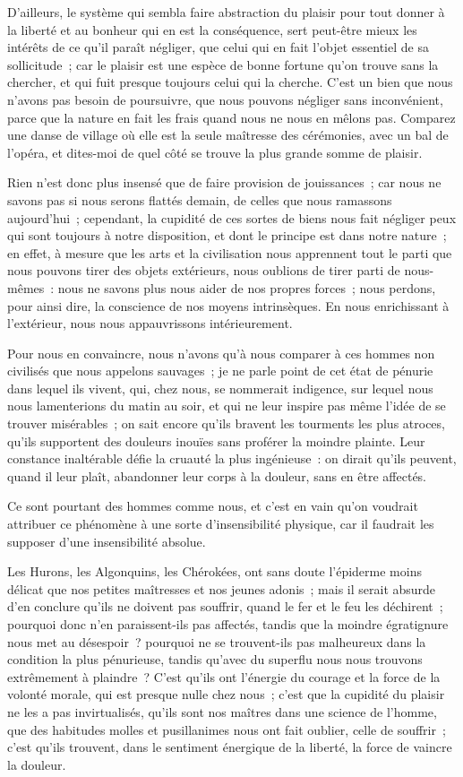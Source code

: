 \documentclass[french,twoside]{book} %
\begin{document}
D’ailleurs, le système qui sembla faire abstraction du plaisir pour tout donner à la liberté et au bonheur qui en est la conséquence, sert peut-être mieux les intérêts de ce qu’il paraît négliger, que celui qui en fait l’objet essentiel de sa sollicitude ; car le plaisir est une espèce de bonne fortune qu’on trouve sans la chercher, et qui fuit presque toujours celui qui la cherche. C’est un bien que nous n’avons pas besoin de poursuivre, que nous pouvons négliger sans inconvénient, parce que la nature en fait les frais quand nous ne nous en mêlons pas. Comparez une danse de village où elle est la seule maîtresse des cérémonies, avec un bal de l’opéra, et dites-moi de quel côté se trouve la plus grande somme de plaisir.\par
Rien n’est donc plus insensé que de faire provision de jouissances ; car nous ne savons pas si nous serons flattés demain, de celles que nous ramassons aujourd’hui ; cependant, la cupidité de ces sortes de biens nous fait négliger peux qui sont toujours à notre disposition, et dont le principe est dans notre nature ; en effet, à mesure que les arts et la civilisation nous apprennent tout le parti que nous pouvons tirer des objets extérieurs, nous oublions de tirer parti de nous-mêmes : nous ne savons plus nous aider de nos propres forces ; nous perdons, pour ainsi dire, la conscience de nos moyens intrinsèques. En nous enrichissant à l’extérieur, nous nous appauvrissons intérieurement.\par
Pour nous en convaincre, nous n’avons qu’à nous comparer à ces hommes non civilisés que nous appelons sauvages ; je ne parle point de cet état de pénurie dans lequel ils vivent, qui, chez nous, se nommerait indigence, sur lequel nous nous lamenterions du matin au soir, et qui ne leur inspire pas même l’idée de se trouver misérables ; on sait encore qu’ils bravent les tourments les plus atroces, qu’ils supportent des douleurs inouïes sans proférer la moindre plainte. Leur constance inaltérable défie la cruauté la plus ingénieuse : on dirait qu’ils peuvent, quand il leur plaît, abandonner leur corps à la douleur, sans en être affectés.\par
Ce sont pourtant des hommes comme nous, et c’est en vain qu’on voudrait attribuer ce phénomène à une sorte d’insensibilité physique, car il faudrait les supposer d’une insensibilité absolue.\par
Les Hurons, les Algonquins, les Chérokées, ont sans doute l’épiderme moins délicat que nos petites maîtresses et nos jeunes adonis ; mais il serait absurde d’en conclure qu’ils ne doivent pas souffrir, quand le fer et le feu les déchirent ; pourquoi donc n’en paraissent-ils pas affectés, tandis que la moindre égratignure nous met au désespoir ? pourquoi ne se trouvent-ils pas malheureux dans la condition la plus pénurieuse, tandis qu’avec du superflu nous nous trouvons extrêmement à plaindre ? C’est qu’ils ont l’énergie du courage et la force de la volonté morale, qui est presque nulle chez nous ; c’est que la cupidité du plaisir ne les a pas invirtualisés, qu’ils sont nos maîtres dans une science de l’homme, que des habitudes molles et pusillanimes nous ont fait oublier, celle de souffrir ; c’est qu’ils trouvent, dans le sentiment énergique de la liberté, la force de vaincre la douleur.\par
\end{document}
